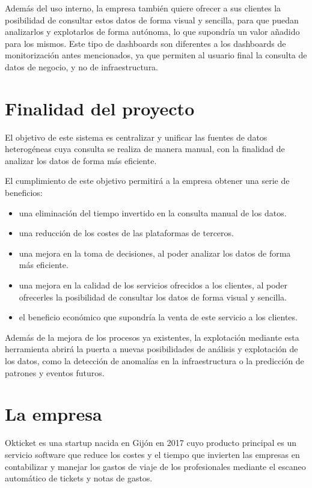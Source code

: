 Además del uso interno, la empresa también quiere ofrecer a sus clientes la posibilidad de
consultar estos datos de forma visual y sencilla, para que puedan analizarlos y explotarlos de
forma autónoma, lo que supondría un valor añadido para los mismos. Este tipo de dashboards
son diferentes a los dashboards de monitorización antes mencionados, ya que permiten al usuario
final la consulta de datos de negocio, y no de infraestructura.

\section{Finalidad del proyecto}\label{sec:finalidad}
El objetivo de este sistema es centralizar y unificar las fuentes de datos heterogéneas
cuya consulta se realiza de manera manual, con la finalidad de analizar los datos de forma
más eficiente.

El cumplimiento de este objetivo permitirá a la empresa obtener una serie de beneficios:
\begin{itemize}
	\item una eliminación del tiempo invertido en la consulta manual de los datos.
	\item una reducción de los costes de las plataformas de terceros.
	\item una mejora en la toma de decisiones, al poder analizar los datos de forma más eficiente.
	\item una mejora en la calidad de los servicios ofrecidos a los clientes, al poder ofrecerles
	      la posibilidad de consultar los datos de forma visual y sencilla.
	\item el beneficio económico que supondría la venta de este servicio a los clientes.
\end{itemize}

Además de la mejora de los procesos ya existentes, la explotación mediante esta herramienta
abrirá la puerta a nuevas posibilidades de análisis y explotación de los datos, como la detección
de anomalías en la infraestructura o la predicción de patrones y eventos futuros.

\section{La empresa}\label{sec:empresa}
Okticket es una startup nacida en Gijón en 2017 cuyo producto principal es un servicio software
que reduce los costes y el tiempo que invierten las empresas en contabilizar y manejar los gastos
de viaje de los profesionales mediante el escaneo automático de tickets y notas de gastos.

